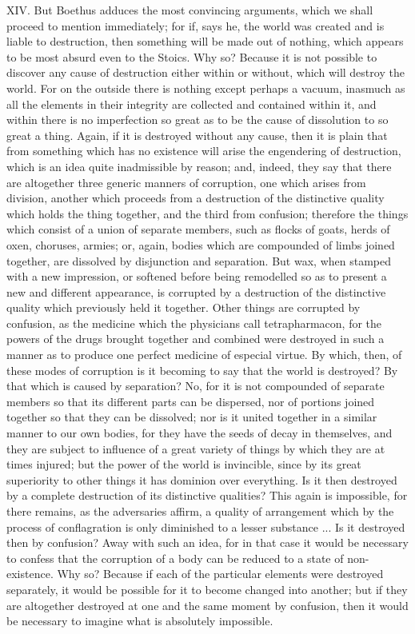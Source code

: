 XIV. But Boethus adduces the most convincing arguments, which we shall proceed to mention
immediately; for if, says he, the world was created and is liable to destruction, then something will
be made out of nothing, which appears to be most absurd even to the Stoics. Why so? Because it
is not possible to discover any cause of destruction either within or without, which will destroy the
world. For on the outside there is nothing except perhaps a vacuum, inasmuch as all the elements
in their integrity are collected and contained within it, and within there is no imperfection so great as
to be the cause of dissolution to so great a thing. Again, if it is destroyed without any cause, then it
is plain that from something which has no existence will arise the engendering of destruction, which
is an idea quite inadmissible by reason; and, indeed, they say that there are altogether three
generic manners of corruption, one which arises from division, another which proceeds from a
destruction of the distinctive quality which holds the thing together, and the third from confusion;
therefore the things which consist of a union of separate members, such as flocks of goats, herds
of oxen, choruses, armies; or, again, bodies which are compounded of limbs joined together, are
dissolved by disjunction and separation. But wax, when stamped with a new impression, or
softened before being remodelled so as to present a new and different appearance, is corrupted
by a destruction of the distinctive quality which previously held it together. Other things are
corrupted by confusion, as the medicine which the physicians call tetrapharmacon, for the powers
of the drugs brought together and combined were destroyed in such a manner as to produce one
perfect medicine of especial virtue. By which, then, of these modes of corruption is it becoming to
say that the world is destroyed? By that which is caused by separation? No, for it is not
compounded of separate members so that its different parts can be dispersed, nor of portions
joined together so that they can be dissolved; nor is it united together in a similar manner to our
own bodies, for they have the seeds of decay in themselves, and they are subject to influence of a
great variety of things by which they are at times injured; but the power of the world is invincible,
since by its great superiority to other things it has dominion over everything. Is it then destroyed by
a complete destruction of its distinctive qualities? This again is impossible, for there remains, as
the adversaries affirm, a quality of arrangement which by the process of conflagration is only
diminished to a lesser substance ... Is it destroyed then by confusion? Away with such an idea, for
in that case it would be necessary to confess that the corruption of a body can be reduced to a
state of non-existence. Why so? Because if each of the particular elements were destroyed
separately, it would be possible for it to become changed into another; but if they are altogether
destroyed at one and the same moment by confusion, then it would be necessary to imagine what
is absolutely impossible.

